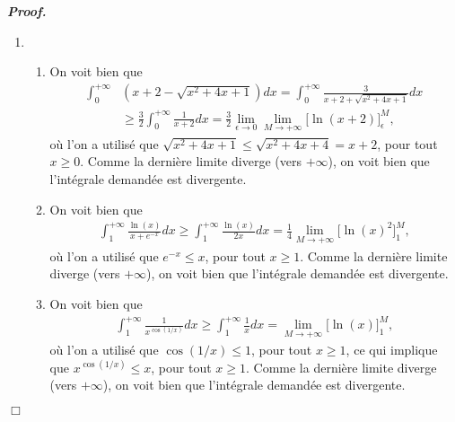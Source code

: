\documentclass[11pt,a4paper]{article}
\newenvironment{preuve}[1][]
{\vskip 2mm  \noindent\emph{\bf Proof#1. }}{$\Box$ \vskip 2mm}
\let\geq\geqslant
\let\leq\leqslant
\begin{document}
	\begin{preuve}
		\begin{enumerate}
			\item 
			\begin{enumerate}[label=(\roman*)]
				\item On voit bien que 
				\begin{align*}
				\int_{0}^{+\infty} &(x+2-\sqrt{x^{2}+4x+1}) dx = \int_{0}^{+\infty} \frac{3}{x+2+\sqrt{x^{2}+4x+1}} dx  
				\\
				&\geq \frac{3}{2} \int_{0}^{+\infty} \frac{1}{x+2} dx = \frac{3}{2} \underset{\epsilon \rightarrow 0}{\lim} \underset{M \rightarrow + \infty}{\lim} \bigg[ \ln(x+2) \bigg]_{\epsilon}^{M},     
				\end{align*}
				où l'on a utilisé que $\sqrt{x^{2}+4x+1} \leq \sqrt{x^{2}+4x+4} = x+2$, pour tout $x \geq 0$. 
				Comme la dernière limite diverge (vers $+ \infty$), on voit bien que l'intégrale demandée est divergente. 
				
				\item On voit bien que 
				\begin{align*}
				\int_{1}^{+\infty} \frac{\ln (x)}{x+e^{-x}} dx \geq \int_{1}^{+\infty} \frac{\ln (x)}{2 x} dx = \frac{1}{4}  \underset{M \rightarrow + \infty}{\lim} \bigg[ \ln(x)^{2} \bigg]_{1}^{M},     
				\end{align*}
				où l'on a utilisé que $e^{-x} \leq x$, pour tout $x \geq 1$. 
				Comme la dernière limite diverge (vers $+ \infty$), on voit bien que l'intégrale demandée est divergente. 
				
				\item On voit bien que 
				\begin{align*}
				\int_{1}^{+\infty} \frac{1}{x^{\cos(1/x)}} dx \geq \int_{1}^{+\infty} \frac{1}{x} dx = \underset{M \rightarrow + \infty}{\lim} \bigg[ \ln(x) \bigg]_{1}^{M},     
				\end{align*}
				où l'on a utilisé que $\cos(1/x) \leq 1$, pour tout $x \geq 1$, ce qui implique que $x^{\cos(1/x)} \leq x$, pour tout $x \geq 1$. 
				Comme la dernière limite diverge (vers $+ \infty$), on voit bien que l'intégrale demandée est divergente. 
				

\end{enumerate}
\end{enumerate}
\end{preuve}
\end{document}
